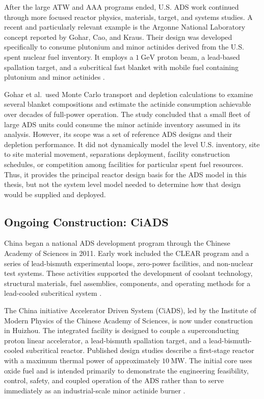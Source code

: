 After the large \gls{ATW} and \gls{AAA} programs ended, U.S. \gls{ADS} work continued through
more focused reactor physics, materials, target, and systems studies. A recent
and particularly relevant example is the Argonne National Laboratory concept
reported by Gohar, Cao, and Kraus. Their design was developed specifically
to consume plutonium and minor actinides derived from the U.S. spent nuclear
fuel inventory. It employs a \(1~\mathrm{GeV}\) proton beam, a lead-based
spallation target, and a subcritical fast blanket with mobile fuel containing
plutonium and minor actinides
\cite{gohar_ads_2021}.

Gohar et al.\ used Monte Carlo transport and depletion calculations to examine
several blanket compositions and estimate the actinide consumption achievable
over decades of full-power operation. The study concluded that a small fleet
of large \gls{ADS} units could consume the minor actinide inventory assumed in its
analysis. However, its scope was a set of reference \gls{ADS} designs and their
depletion performance. It did not dynamically model the  level U.S.
inventory, site to site material movement, separations deployment,
facility construction schedules, or competition among facilities for
particular spent fuel resources. Thus, it provides the principal reactor
design basis for the \gls{ADS} model in this thesis, but not the system level model
needed to determine how that design would be supplied and deployed.

\subsection{Ongoing Construction: CiADS}
\label{subsec:ciads}

China began a national \gls{ADS} development program through the Chinese Academy
of Sciences in 2011. Early work included the
\gls{CLEAR} program and a series of lead-bismuth experimental loops, zero-power
facilities, and non-nuclear test systems. These activities supported the
development of coolant technology, structural materials, fuel assemblies,
components, and operating methods for a lead-cooled subcritical system
\cite{wu_design_2016}.

The China initiative Accelerator Driven System (CiADS), led by the Institute
of Modern Physics of the Chinese Academy of Sciences, is now under
construction in Huizhou. The integrated facility is designed to couple a
superconducting proton linear accelerator, a lead-bismuth spallation target,
and a lead-bismuth-cooled subcritical reactor. Published design studies
describe a first-stage reactor with a maximum thermal power of approximately
\(10~\mathrm{MW}\). The initial core uses oxide fuel and is intended primarily
to demonstrate the engineering feasibility, control, safety, and coupled
operation of the \gls{ADS} rather than to serve immediately as an industrial-scale
minor actinide burner
\cite{yin_power_2022,wang_transient_2023}.

